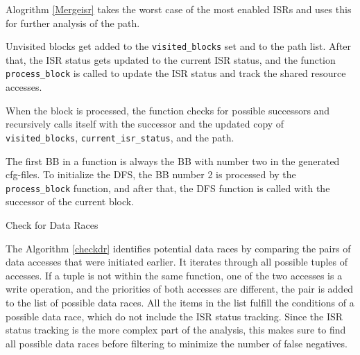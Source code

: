 \documentclass[
fancyheadings, %
%
%
]{stsreprt}
\begin{document}
{\vspace{1cm}

Alogrithm \ref{Mergeisr} takes the worst case of the most enabled \acp{ISR} and uses this for further analysis of the path.

Unvisited blocks get added to the \texttt{visited\_blocks} set and to the path list. After that, the \ac{ISR} status gets updated to the current \ac{ISR} status, and the function \texttt{process\_block} is called to update the \ac{ISR} status and track the shared resource accesses.

When the block is processed, the function checks for possible successors and recursively calls itself with the successor and the updated copy of \texttt{visited\_blocks}, \texttt{current\_isr\_status}, and the path.

The first \ac{BB} in a function is always the \ac{BB} with number two in the generated cfg-files. To initialize the \ac{DFS}, the \ac{BB} number 2 is processed by the \texttt{process\_block} function, and after that, the \ac{DFS} function is called with the successor of the current block.

\begin{algorithm}[H]
	\label{checkdr}
	\caption{Check for Data Races}
	\DontPrintSemicolon
	\SetAlgoLined
	\BlankLine
\end{algorithm}
\vspace{1cm}

The Algorithm \ref{checkdr} identifies potential data races by comparing the pairs of data accesses that were initiated earlier. It iterates through all possible tuples of accesses. If a tuple is not within the same function, one of the two accesses is a write operation, and the priorities of both accesses are different, the pair is added to the list of possible data races. All the items in the list fulfill the conditions of a possible data race, which do not include the \ac{ISR} status tracking. Since the \ac{ISR} status tracking is the more complex part of the analysis, this makes sure to find all possible data races before filtering to minimize the number of false negatives.

}
\end{document}
